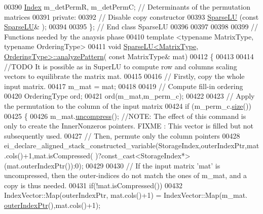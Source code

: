 \begin{DoxyCode}
00390     \hyperlink{namespace_eigen_a62e77e0933482dafde8fe197d9a2cfde}{Index} m\_detPermR, m\_detPermC; \textcolor{comment}{// Determinants of the permutation matrices}
00391   \textcolor{keyword}{private}:
00392     \textcolor{comment}{// Disable copy constructor }
00393     \hyperlink{group___sparse_l_u___module_class_eigen_1_1_sparse_l_u}{SparseLU} (\textcolor{keyword}{const} \hyperlink{group___sparse_l_u___module_class_eigen_1_1_sparse_l_u}{SparseLU}& );
00394   
00395 \}; \textcolor{comment}{// End class SparseLU}
00396 
00397 
00398 
00399 \textcolor{comment}{// Functions needed by the anaysis phase}
00410 \textcolor{comment}{}\textcolor{keyword}{template} <\textcolor{keyword}{typename} MatrixType, \textcolor{keyword}{typename} OrderingType>
00411 \textcolor{keywordtype}{void} \hyperlink{group___sparse_l_u___module_aa907ff958c4f4855145091d2686f3a8a}{SparseLU<MatrixType, OrderingType>::analyzePattern}(\textcolor{keyword}{
      const} MatrixType& mat)
00412 \{
00413   
00414   \textcolor{comment}{//TODO  It is possible as in SuperLU to compute row and columns scaling vectors to equilibrate the matrix
       mat.}
00415   
00416   \textcolor{comment}{// Firstly, copy the whole input matrix. }
00417   m\_mat = mat;
00418   
00419   \textcolor{comment}{// Compute fill-in ordering}
00420   OrderingType ord; 
00421   ord(m\_mat,m\_perm\_c);
00422   
00423   \textcolor{comment}{// Apply the permutation to the column of the input  matrix}
00424   \textcolor{keywordflow}{if} (m\_perm\_c.\hyperlink{group___core___module_a2216f9ce7b453ac39c46ff0323daeac9}{size}())
00425   \{
00426     m\_mat.\hyperlink{group___sparse_core___module_a7e560ebda035e992d2c99875cc7c3af3}{uncompress}(); \textcolor{comment}{//NOTE: The effect of this command is only to create the InnerNonzeros
       pointers. FIXME : This vector is filled but not subsequently used.  }
00427     \textcolor{comment}{// Then, permute only the column pointers}
00428     ei\_declare\_aligned\_stack\_constructed\_variable(StorageIndex,outerIndexPtr,mat.cols()+1,mat.isCompressed(
      )?\textcolor{keyword}{const\_cast<}StorageIndex*\textcolor{keyword}{>}(mat.outerIndexPtr()):0);
00429     
00430     \textcolor{comment}{// If the input matrix 'mat' is uncompressed, then the outer-indices do not match the ones of m\_mat,
       and a copy is thus needed.}
00431     \textcolor{keywordflow}{if}(!mat.isCompressed()) 
00432       IndexVector::Map(outerIndexPtr, mat.cols()+1) = IndexVector::Map(m\_mat.
      \hyperlink{group___sparse_core___module_a75506964d86d6badb32d0b4917acf2e2}{outerIndexPtr}(),mat.cols()+1);

\end{DoxyCode}
